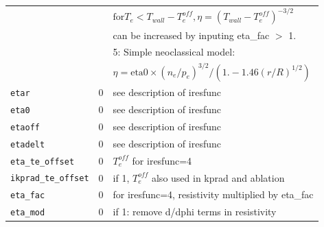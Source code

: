 \begin{tabular}{llp{4.0in}}
                    &   & $\mbox{for} T_e < T_{wall} - T_e^{off}, \eta = (T_{wall}-T_e^{off})^{-3/2} $ \\
                    &   & can be increased by inputing eta\_fac $>$ 1.  \\
                    &   & 5:  Simple neoclassical model:  \\
                    &   & $\eta = \mbox{eta0} \times (n_e/p_e)^{3/2} / (1. - 1.46 (r/R)^{1/2})   $ \\
 \texttt{etar}    & 0 & see description of iresfunc \\
  \texttt{eta0}   & 0 & see description of iresfunc \\
  \texttt{etaoff} & 0 & see description of iresfunc \\
  \texttt{etadelt} & 0 & see description of iresfunc \\
  \texttt{eta\_te\_offset} & 0 & $T_e^{off}$  for iresfunc=4 \\
  \texttt{ikprad\_te\_offset} & 0 & if 1, $T_e^{off}$ also used in kprad and ablation \\
  \texttt{eta\_fac} & 0 & for iresfunc=4, resistivity multiplied by eta\_fac \\
  \texttt{eta\_mod} & 0 & if 1: remove d/dphi terms in resistivity \\
\end{tabular}

